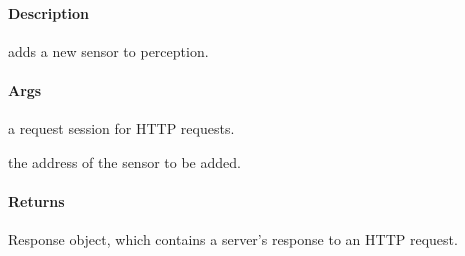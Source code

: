\documentclass[letterpaper,10pt,english]{sphinxmanual}
\begin{document}
\begin{fulllineitems}
\label{\detokenize{gemini_perception_API:gemini_perception_API.add_senor}}
\pysigstartsignatures
{}
\pysigstopsignatures

\paragraph{Description}
\label{\detokenize{gemini_perception_API:id2}}
\sphinxAtStartPar
adds a new sensor to perception.


\paragraph{Args}
\label{\detokenize{gemini_perception_API:id3}}\begin{description}
\sphinxAtStartPar
a request session for HTTP requests.

\sphinxAtStartPar
the address of the sensor to be added.

\end{description}


\paragraph{Returns}
\label{\detokenize{gemini_perception_API:id4}}\begin{description}
\sphinxAtStartPar
Response object, which contains a server’s response to an HTTP request.

\end{description}

\end{fulllineitems}

\end{document}
